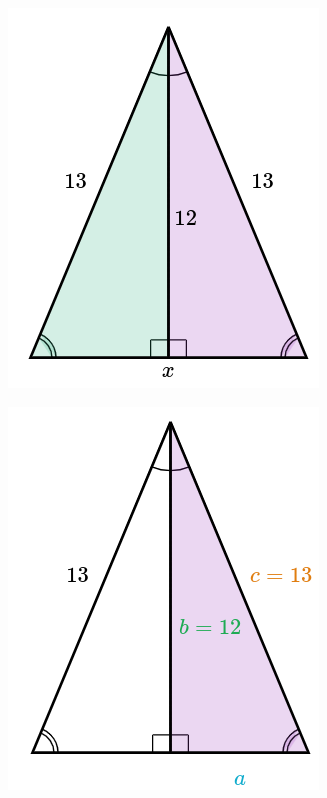 \begin{solutionbox}{16cm}
    \begin{minipage}{0.2\textwidth}
        \begin{figure}[H]
            \centering
            \includegraphics[width=0.8\linewidth]{../images/pitagoras13a.png}
            \caption{}
            \label{fig:pitagoras13a}
        \end{figure}
        \begin{figure}[H]
            \centering
            \includegraphics[width=0.8\linewidth]{../images/pitagoras13b.png}

\end{figure}
\end{minipage}
\end{solutionbox}

